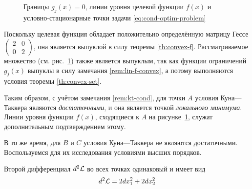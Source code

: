 \begin{figure}[!h]
  \centering
  \caption{Границы $g_j(x)=0$, линии уровня
    целевой функции $f(x)$ и условно-стационарные точки задачи
    \eqref{eq:cond-optim-problem}}
  \label{fig:cond-optim}
\end{figure}

Поскольку целевая функция обладает положительно определённую матрицу
Гессе $\left( \begin{smallmatrix}2 & 0 \\ 0 & 2\end{smallmatrix}
\right)$, она является выпуклой в силу теоремы \ref{th:convex-f}.
Рассматриваемое множество (см. рис. \ref{fig:cond-optim}) также
является выпуклым, так как функции ограничений $g_j(x)$ выпуклы в силу
замечания \ref{rem:lin-f-convex}, а потому выполняются условия теоремы
\ref{th:convex-set}.

Таким образом, с учётом замечания \ref{rem:kt-cond}, для точки $A$
условия Куна—Таккера являются \emph{достаточными}, и она является
точкой \emph{локального минимума}. Линии уровня функции $f(x)$,
сходящиеся к $A$ на рисунке \ref{fig:cond-optim}, служат
дополнительным подтверждением этому.

В то же время, для $B$ и $C$ условия Куна—Таккера не являются
достаточными. Воспользуемся для их исследования условиями высших
порядков.

Второй дифференциал $d^2\mathcal{L}$ во всех точках одинаковый и имеет вид
\begin{equation}
  \label{eq:la-diff}
  d^2\mathcal{L} = 2dx_1^2 + 2 dx_2^2
\end{equation}

